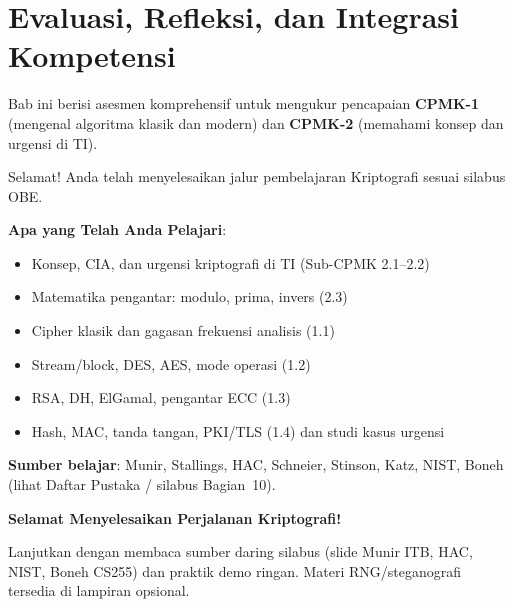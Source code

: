 \documentclass[main.tex]{subfiles}
\begin{document}
\chapter{Evaluasi, Refleksi, dan Integrasi Kompetensi}

Bab ini berisi asesmen komprehensif untuk mengukur pencapaian \textbf{CPMK-1} (mengenal algoritma klasik dan modern) dan \textbf{CPMK-2} (memahami konsep dan urgensi di TI).







\begin{rangkuman}
Selamat! Anda telah menyelesaikan jalur pembelajaran Kriptografi sesuai silabus OBE.

\textbf{Apa yang Telah Anda Pelajari}:
\begin{itemize}
  \item Konsep, CIA, dan urgensi kriptografi di TI (Sub-CPMK 2.1--2.2)
  \item Matematika pengantar: modulo, prima, invers (2.3)
  \item Cipher klasik dan gagasan frekuensi analisis (1.1)
  \item Stream/block, DES, AES, mode operasi (1.2)
  \item RSA, DH, ElGamal, pengantar ECC (1.3)
  \item Hash, MAC, tanda tangan, PKI/TLS (1.4) dan studi kasus urgensi
\end{itemize}

\textbf{Sumber belajar}: Munir, Stallings, HAC, Schneier, Stinson, Katz, NIST, Boneh (lihat Daftar Pustaka / silabus Bagian~10).
\end{rangkuman}

\begin{transition}
\textbf{Selamat Menyelesaikan Perjalanan Kriptografi!}

Lanjutkan dengan membaca sumber daring silabus (slide Munir ITB, HAC, NIST, Boneh CS255) dan praktik demo ringan. Materi RNG/steganografi tersedia di lampiran opsional.
\end{transition}

\ifSubfilesClassLoaded{
  \renewcommand{\bibname}{Daftar Pustaka}
  
  
}{}
\end{document}
